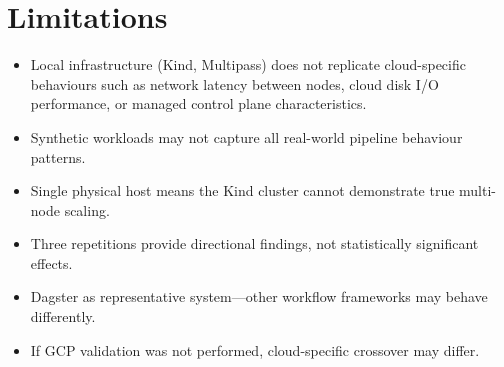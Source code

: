 
\section{Limitations}
\label{sec:limitations}

\begin{itemize}
  \item Local infrastructure (Kind, Multipass) does not replicate cloud-specific behaviours such as network latency between nodes, cloud disk I/O performance, or managed control plane characteristics.
  \item Synthetic workloads may not capture all real-world pipeline behaviour patterns.
  \item Single physical host means the Kind cluster cannot demonstrate true multi-node scaling.
  \item Three repetitions provide directional findings, not statistically significant effects.
  \item Dagster as representative system---other workflow frameworks may behave differently.
  \item If GCP validation was not performed, cloud-specific crossover may differ.
\end{itemize}

